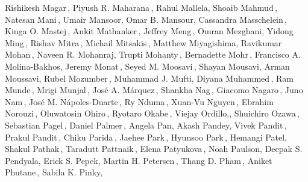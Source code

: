 \begin{center}
Rishikesh Magar\,,\;
Piyush R. Maharana\,,\;
Rahul Mallela,\;
Shoaib Mahmud\,,\;
Natesan Mani\,,\;
Umair Mansoor,\;
Omar B. Mansour,\;
Cassandra Masschelein\,,\;
Kinga O. Mastej\,,\;
Ankit Mathanker\,,\;
Jeffrey Meng\,,\;
Omran Mezghani,\;
Yidong Ming\,,\;
Rishav Mitra\,,\;
Michail Mitsakis\,,\;
Matthew Miyagishima,\;
Ravikumar Mohan\,,\;
Naveen R. Mohanraj,\;
Trupti Mohanty\,,\;
Bernadette Mohr\,,\;
Francisco A. Molina-Bakhos,\;
Jeremy Monat\,,\;
Seyed M. Moosavi\,,\;
Shayan Mousavi,\;
Arman Moussavi,\;
Rubel Mozumber\,,\;
Muhammad J. Mufti,\;
Diyana Muhammed\,,\;
Ram Munde\,,\;
Mrigi Munjal\,,\;
José A. Márquez\,,\;
Shankha Nag\,,\;
Giacomo Nagaro\,,\;
Juno Nam\,,\;
Jos\'e M. N\'apoles-Duarte\,,\;
Ry Nduma\,,\;
Xuan-Vu Nguyen\,,\;
Ebrahim Norouzi\,,\;
Oluwatosin Ohiro\,,\;
Ryotaro Okabe\,,\;
Viejay Ordillo,,\;
Shuichiro Ozawa\,,\;
Sebastian Pagel\,,\;
Daniel Palmer\,,\;
Angela Pan,\;
Akash Pandey,\;
Vivek Pandit\,,\;
Prakul Pandit\,,\;
Chiku Parida\,,\;
Jaehee Park\,,\;
Hyunsoo Park\,,\;
Hemangi Patel,\;
Shakul Pathak\,,\;
Taradutt Pattnaik\,,\;
Elena Patyukova\,,\;
Noah Paulson,\;
Deepak S. Pendyala,\;
Erick S. Pepek,\;
Martin H. Petersen\,,\;
Thang D. Pham\,,\;
Aniket Phutane\,,\;
Sabila K. Pinky,\;

\end{center}
